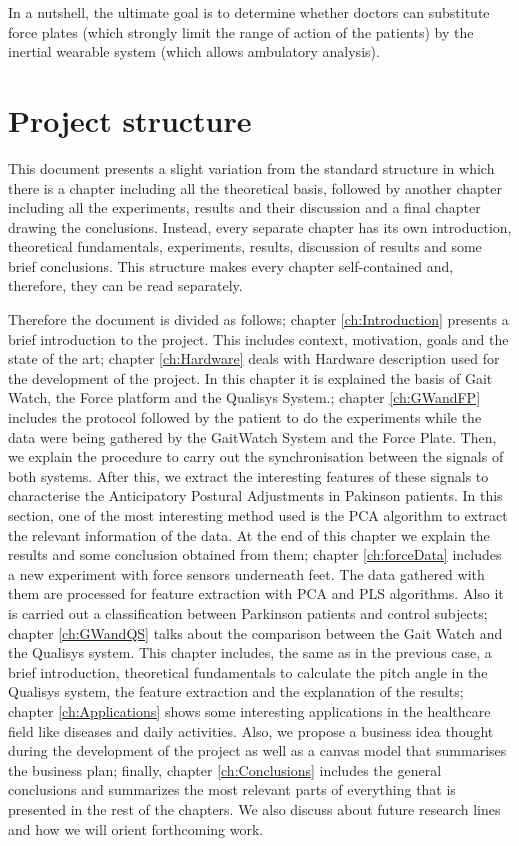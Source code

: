 In a nutshell, the ultimate goal is to determine whether doctors can substitute force plates (which strongly limit the range of action of the patients) by the inertial wearable system (which allows ambulatory analysis).


\section{Project structure}
This document presents a slight variation from the standard structure in which there is a chapter including all the theoretical basis, followed by another chapter including all the experiments, results and their discussion and a final chapter drawing the conclusions. Instead, every separate chapter has its own introduction, theoretical fundamentals, experiments, results, discussion of results and some brief conclusions. This structure makes every chapter self-contained and, therefore, they can be read separately.
 
Therefore the document is divided as follows; chapter \ref{ch:Introduction} presents a brief introduction to the project. This includes  context, motivation, goals and the state of the art; chapter \ref{ch:Hardware} deals with Hardware description used for the development of the project. In this chapter it is explained the basis of Gait Watch, the Force platform and the Qualisys System.; chapter \ref{ch:GWandFP} includes the protocol followed by the patient to do the experiments while the data were being gathered by the GaitWatch System and the Force Plate. Then, we explain the procedure to carry out the synchronisation between the signals of both systems. After this, we extract the interesting features of these signals to characterise the Anticipatory Postural Adjustments in Pakinson patients. In this section, one of the most interesting method used is the PCA algorithm to extract the relevant information of the data. At the end of this chapter we explain the results and some conclusion obtained from them; chapter \ref{ch:forceData} includes a new experiment with force sensors underneath feet. The data gathered with them are processed for feature extraction with PCA and PLS algorithms. Also it is carried out a classification between Parkinson patients and control subjects; chapter \ref{ch:GWandQS} talks about the comparison between the Gait Watch and the Qualisys system. This chapter includes, the same as in the previous case, a brief introduction, theoretical fundamentals to calculate the pitch angle in the Qualisys system, the feature extraction and the explanation of the results; chapter \ref{ch:Applications} shows some interesting applications in the healthcare field  like diseases and daily activities. Also, we propose a business idea thought during the development of the project as well as a canvas model that summarises the business plan; finally, chapter \ref{ch:Conclusions} includes the general conclusions and summarizes the most relevant parts of everything that is presented in the rest of the chapters. We also discuss about future research lines and how we will orient forthcoming work.


